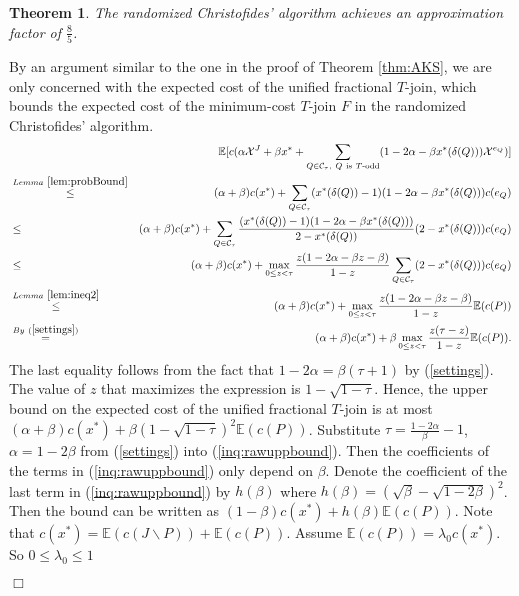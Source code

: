 \documentclass[11pt]{article}
\newcommand{\qed}{\hspace*{\fill}$\Box$}
\newtheorem{theorem}{Theorem}[section]
\newenvironment{proof}[1][Proof. ]{\noindent {\bf #1 }}{\qed}
\begin{document}
\begin{theorem}\cite{sebo13}
The randomized Christofides' algorithm achieves an
approximation factor of $\frac{8}{5}$.
\end{theorem}
\begin{proof}
By an argument similar to the one in the proof of Theorem \ref{thm:AKS}, we are only concerned with the expected cost of the unified fractional $T$-join, which bounds the expected cost of the minimum-cost $T$-join $F$ in the randomized Christofides' algorithm.
\begin{eqnarray}\label{inq:rawuppbound}
&&\mathbb{E}[ c(\alpha \mathcal{X}^J+ \beta x^* + \sum_{Q\in \mathcal{C}_\tau,\ Q\ \textnormal{is} \ T\textnormal{-odd}} (1-2\alpha -\beta x^*(\delta(Q)))\mathcal{X}^{e_{Q}}) ] \nonumber \\
 &\stackrel{Lemma\ \ref{lem:probBound}}{\leq}& (\alpha+\beta)c(x^*)+\sum_{Q\in \mathcal{C}_\tau}(x^*(\delta(Q))-1)(1-2\alpha -\beta x^*(\delta(Q)))c(e_Q) \nonumber \\
 &\leq & (\alpha+\beta)c(x^*)+\sum_{Q\in \mathcal{C}_\tau}\frac{(x^*(\delta(Q))-1)(1-2\alpha -\beta x^*(\delta(Q)))}{2-x^*(\delta(Q))}(2-x^*(\delta(Q)))c(e_Q) \nonumber \\
 &\leq& (\alpha+\beta)c(x^*)+ \max_{0\leq z<\tau}\frac{z(1-2\alpha-\beta z-\beta)}{1-z} \sum_{Q\in \mathcal{C}_\tau}(2-x^*(\delta(Q)))c(e_Q) \nonumber \\
 &\stackrel{Lemma\ \ref{lem:ineq2}}{\leq}& (\alpha+\beta)c(x^*)+ \max_{0\leq z<\tau}\frac{z(1-2\alpha-\beta z-\beta)}{1-z}\mathbb{E}(c(P)) \nonumber \\
 &\stackrel{By\ (\ref{settings})}{=}& (\alpha+\beta)c(x^*)+ \beta\max_{0\leq z<\tau}\frac{z(\tau-z)}{1-z}\mathbb{E}(c(P)).
\end{eqnarray}
The last equality follows from the fact that $1-2\alpha=\beta(\tau+1)$ by (\ref{settings}). The value of $z$ that maximizes the expression is $1-\sqrt{1-\tau}$. Hence, the upper bound on the expected cost of the unified fractional
$T$-join is at most $(\alpha + \beta)c(x^*) + \beta(1-\sqrt{1-\tau})^2\mathbb{E}(c(P))$. Substitute $\tau=\frac{1-2\alpha}{\beta}-1$, $\alpha =1- 2\beta$ from (\ref{settings}) into (\ref{inq:rawuppbound}). Then the coefficients of the terms in (\ref{inq:rawuppbound}) only depend on $\beta$. Denote the coefficient of the last term in (\ref{inq:rawuppbound}) by $h(\beta)$ where $h(\beta)=(\sqrt{\beta}-\sqrt{1-2\beta})^2$. Then the bound can be written as $(1-\beta)c(x^*)+h(\beta)\mathbb{E}(c(P))$.
Note that $c(x^*)=\mathbb{E}(c(J\backslash P))+\mathbb{E}(c(P))$. Assume $\mathbb{E}(c(P))=\lambda_0 c(x^*)$. So $0\leq \lambda_0 \leq 1$

\end{proof}
\end{document}
